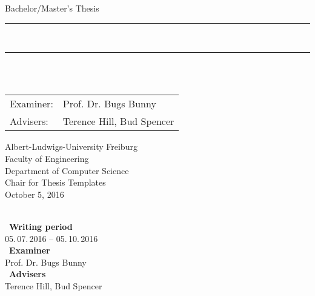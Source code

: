 
\begin{titlepage}
\begin{center}

\newcommand{\HorizontalLine}{\rule{\linewidth}{0.3mm}}

{\Large Bachelor/Master's Thesis}\\[1.3cm]


\HorizontalLine \\[0.4cm]
{ \huge \bfseries \thetitle }
\HorizontalLine \\[1.5cm]


{\Huge \theauthor} \\[2cm]


\begin{tabular}[hc]{>{\huge}l >{\huge}l}
  Examiner: & Prof. Dr. Bugs Bunny \\[0.3cm]
  Advisers: & Terence Hill, Bud Spencer \\[1.2cm]
\end{tabular}
\vfill  %

\Large {
    Albert-Ludwigs-University Freiburg\\
    Faculty of Engineering\\
    Department of Computer Science\\
    Chair for Thesis Templates\\[1cm]

    October 5, 2016\\
}
\end{center}
\end{titlepage}

\thispagestyle{empty}
\ \vfill \ \\  %
\
\textbf{Writing period}            \smallskip{} \\
05.\,07.\,2016 -- 05.\,10.\,2016   \bigskip{} \\
\
\textbf{Examiner}                  \smallskip{} \\
Prof. Dr. Bugs Bunny               \bigskip{} \\
\
\textbf{Advisers}                  \smallskip{} \\
Terence Hill, Bud Spencer
